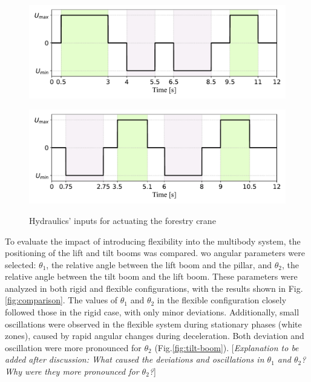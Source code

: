 \begin{figure}[ht]
    \centering
    \begin{minipage}{\textwidth}
        \centering
        \includegraphics[width=\textwidth]{Signal-Lift.pdf}
         \label{LiftSignal}
    \end{minipage}
    \vspace{1em}  %
    \begin{minipage}{\textwidth}
        \centering
        \includegraphics[width=\textwidth]{Signal-Tilt.pdf}
         \label{TiltSignal}
    \end{minipage}

    \caption{Hydraulics' inputs for actuating the forestry crane}
    \label{Signal}
\end{figure}

To evaluate the impact of introducing flexibility into the multibody system, the positioning of the lift and tilt booms was compared. wo angular parameters were selected: $\theta_1$, the relative angle between the lift boom and the pillar, and $\theta_2$, the relative angle between the tilt boom and the lift boom. These parameters were analyzed in both rigid and flexible configurations, with the results shown in Fig.\ref{fig:comparison}.  The values of $\theta_1$ and $\theta_2$ in the flexible configuration closely followed those in the rigid case, with only minor deviations. Additionally, small oscillations were observed in the flexible system during stationary phases (white zones), caused by rapid angular changes during deceleration. Both deviation and oscillation were more pronounced for $\theta_2$ (Fig.\ref{fig:tilt-boom}).
[\textit{Explanation to be added after discussion: What caused the deviations and oscillations in $\theta_1$ and $\theta_2$? Why were they more pronounced for $\theta_2$?}]

